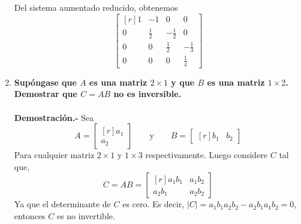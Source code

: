 \begin{enumerate}
    Del sistema aumentado reducido, obtenemos
	    $$\begin{bmatrix*}[r]
		1&-1&0&0\\
		0&\frac{1}{2}&-\frac{1}{2}&0\\
		0&0&\frac{1}{2}&-\frac{1}{3}\\
		0&0&0&\frac{1}{4}
	    \end{bmatrix*}$$
	    \vspace{0.5cm}


    \item \textbf{\boldmath Supóngase que $A$ es una matriz $2\times 1$ y que $B$ es una matriz $1\times 2$. Demostrar que $C=AB$ no es inversible.\\\\
	Demostración.-}\; Sea $$A=\begin{bmatrix*}[r]
	    a_1\\
	    a_2
	\end{bmatrix*} \qquad \mbox{y} \qquad B=\begin{bmatrix*}[r]
	b_1 & b_2
    \end{bmatrix*}$$
    Para cualquier matriz $2\times 1$ y $1\times 3$ respectivamente. Luego considere $C$ tal que,
    $$C=AB=\begin{bmatrix*}[r]
	a_1b_1 & a_1b_2\\
	a_2b_1 & a_2b_2
    \end{bmatrix*}$$
    Ya que el determinante de $C$ es cero. Es decir, $|C|=a_1b_1a_2b_2-a_2b_1a_1b_2=0$, entonces $C$ es no invertible.\\\\
    


\end{enumerate}
